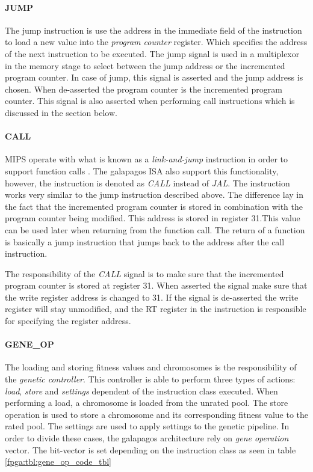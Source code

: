 
\paragraph{JUMP}
The jump instruction is use the address in the immediate field of the instruction to load a new value into the \emph{program counter} register. Which specifies the address of the next instruction to be executed. The jump signal is used in a multiplexor in the memory stage to select between the jump address or the incremented program counter. In case of jump, this signal is asserted and the jump address is chosen. When de-asserted the program counter is the incremented program counter. This signal is also asserted when performing call instructions which is discussed in the section below.   

\paragraph{CALL}
MIPS operate with what is known as a \emph{link-and-jump} instruction in order to support function calls \cn. The galapagos ISA also support this functionality, however, the instruction is denoted as \emph{CALL} instead of \emph{JAL}. The instruction works very similar to the jump instruction described above. The difference lay in the fact that the incremented program counter is stored in combination with the program counter being modified. This address is stored in register 31.This value can be used later when returning from the function call. The return of a function is basically a jump instruction that jumps back to the address after the call instruction.

The responsibility of the \emph{CALL} signal is to make sure that the incremented program counter is stored at register 31. When asserted the signal make sure that the write register address is changed to 31. If the signal is de-asserted the write register will stay unmodified, and the RT register in the instruction is responsible for specifying the register address.


\paragraph{GENE\_OP}
The loading and storing fitness values and chromosomes is the responsibility of the \emph{genetic controller}. This controller is able to perform three types of actions: \emph{load}, \emph{store} and \emph{settings} dependent of the instruction class executed. When performing a load, a chromosome is loaded from the unrated pool. The store operation is used to store a chromosome and its corresponding fitness value to the rated pool. The settings are used to apply settings to the genetic pipeline.  In order to divide these cases, the galapagos architecture rely on \emph{gene operation} vector. The bit-vector is set depending on the instruction class as seen in table \ref{fpga:tbl:gene_op_code_tbl}



